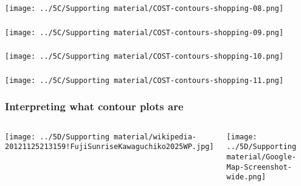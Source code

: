 \documentclass[11pt,aspectratio=169,mathserif]{beamer}
\begin{document}
\begin{frame}\frametitle{}
	\centerline{\texttt{[image: ../5C/Supporting material/COST-contours-shopping-08.png]}}
\end{frame}
\begin{frame}\frametitle{}
	\centerline{\texttt{[image: ../5C/Supporting material/COST-contours-shopping-09.png]}}
\end{frame}
\begin{frame}\frametitle{}
	\centerline{\texttt{[image: ../5C/Supporting material/COST-contours-shopping-10.png]}}
\end{frame}
\begin{frame}\frametitle{}
	\centerline{\texttt{[image: ../5C/Supporting material/COST-contours-shopping-11.png]}}
\end{frame}
\begin{frame}\frametitle{Interpreting what contour plots are}
	\begin{columns}[b]
			\centerline{\texttt{[image: ../5D/Supporting material/wikipedia-20121125213159!FujiSunriseKawaguchiko2025WP.jpg]}}
			
		
			\centerline{\texttt{[image: ../5D/Supporting material/Google-Map-Screenshot-wide.png]}}

	\end{columns}
\end{frame}
\end{document}
